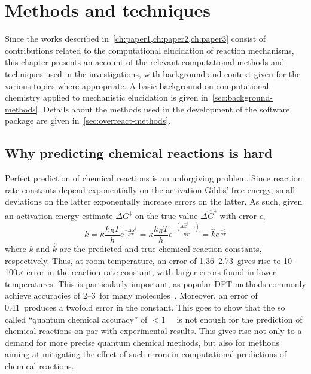 \chapter{Methods and techniques}%
\label{ch:methods}

Since the works described in~\cref{ch:paper1,ch:paper2,ch:paper3} consist
of contributions related to the computational elucidation of reaction mechanisms,
this chapter presents an account of the relevant computational methods and
techniques used in the investigations,
with background and context given
for the various topics where appropriate.
A basic background on computational chemistry applied
to mechanistic elucidation is given in~\cref{sec:background-methods}.
Details about the methods used in the development of the \overreact software
package are given in~\cref{sec:overreact-methods}.

\section{Why predicting chemical reactions is hard}

Perfect prediction of chemical reactions is an unforgiving problem.
Since reaction rate constants depend exponentially on the activation Gibbs' free energy,
small deviations on the latter exponentally increase errors on the latter.
As such,
given an activation energy estimate $\Delta G^\ddagger$
on the true value $\Delta \widehat{G}^\ddagger$
with error $\epsilon$,
%
\begin{equation}
	k = \kappa \frac{k_B T}{h} e^\frac{- \Delta G^\ddagger}{R T}
	= \kappa \frac{k_B T}{h} e^\frac{- \left(\Delta \widehat{G}^\ddagger + \epsilon\right)}{R T}
	= \widehat{k} e^\frac{- \epsilon}{R T}
\end{equation}
%
where $k$ and $\widehat{k}$ are the predicted and true chemical reaction constants,
respectively.
Thus,
at room temperature,
an error of 1.36--2.73~\kcalmol gives rise to 10--100$\times$ error
in the reaction rate constant,
with larger errors found in lower temperatures.
This is particularly important,
as popular DFT methods commonly achieve accuracies of
2--3~\kcalmol for many molecules~\cite{Becke_2014,Bogojeski_2020}.
Moreover,
an error of 0.41~\kcalmol produces a twofold error in the constant.
This goes to show that the so called ``quantum chemical accuracy'' of
$<$1~\kcalmol~\cite{Bogojeski_2020}
is not enough for the prediction of chemical reactions on par with experimental results.
This gives rise not only to a demand
for more precise quantum chemical methods,
but also for methods aiming at mitigating the effect of such errors
in computational predictions of chemical reactions.

